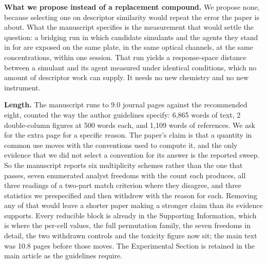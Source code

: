\documentclass[11pt,letterpaper]{article}
\begin{document}
\textbf{What we propose instead of a replacement compound.} We propose none,
because selecting one on descriptor similarity would repeat the error the
paper is about. What the manuscript specifies is the measurement that would
settle the question: a bridging run in which candidate simulants and the agents
they stand in for are exposed on the same plate, in the same optical channels,
at the same concentrations, within one session. That run yields a response-space
distance between a simulant and its agent measured under identical conditions,
which no amount of descriptor work can supply. It needs no new chemistry and
no new instrument.

\textbf{Length.} The manuscript runs to 9.0 journal pages against the
recommended eight, counted the way the author guidelines specify:
6,865 words of text, 2 double-column figures at 500 words each,
and 1,109 words of references. We ask for the extra page for a specific
reason. The
paper's claim is that a quantity in common use moves with the conventions used
to compute it, and the only evidence that we did not select a convention for
its answer is the reported sweep. So the manuscript reports six multiplicity
schemes rather than the one that passes, seven enumerated analyst freedoms with
the count each produces, all three readings of a two-part match criterion where
they disagree, and three statistics we prespecified and then withdrew with the
reason for each. Removing any of that would leave a shorter paper making a
stronger claim than its evidence supports. Every reducible block is already in
the Supporting Information, which is where the per-cell values, the full
permutation family, the seven freedoms in detail, the two withdrawn controls
and the toxicity figure now sit; the main text was 10.8 pages before those
moves. The Experimental
Section is retained in the main article as the guidelines require.
\end{document}
